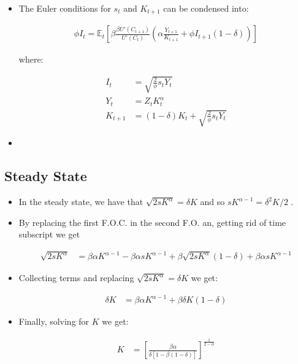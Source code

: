 \documentclass[11pt]{article}
\newcommand{\E}{\mathbb{E}}
\numberwithin{equation}{section}
\begin{document}
\begin{itemize}
 \item The Euler conditions for $s_{t}$ and $K_{t+1}$ can be condensed into:
 
 \begin{align*}
 \phi I_{t} = \E_t \left[ \beta \frac{\beta U'(C_{t+1})}{U'(C_t)} \left(\alpha \frac{Y_{t+1}}{K_{t+1}} + \phi I_{t+1} (1-\delta) \right) \right]
 \end{align*}
 
 where:
 
 \begin{align*}
 I_t & = \sqrt{\frac{2}{\phi} s_t Y_{t}} \\
 Y_t & = Z_t K^{\alpha}_t \\
 K_{t+1} & = (1-\delta) K_t + \sqrt{\frac{2}{\phi} s_t Y_t}
 \end{align*} 
 
 \item 
\end{itemize}

	
	\subsection{Steady State}
	\begin{itemize}	
	\item In the steady state, we have that $\sqrt{2 s K^\alpha} = \delta K$ and so $s K^{\alpha-1} =\delta^2 K/2$ .
	
	\item By replacing the first F.O.C. in the second F.O. an, getting rid of time subscript we get
	
	\begin{align} \sqrt{2 s K^\alpha}& = \beta \alpha K^{\alpha-1}  - \beta \alpha s K^{\alpha-1} +\beta \sqrt{2 s K^\alpha} (1-\delta) + \beta \alpha s  K^{\alpha-1}
	\end{align}
	
	\item Collecting terms and replacing $\sqrt{2 s K^\alpha} = \delta K$ we get:
	
	\begin{align} \delta K & = \beta \alpha K^{\alpha-1} +\beta \delta K (1-\delta) 
	\end{align}
	
	\item Finally, solving for $K$ we get:
	
		\begin{align}  K & = \left[\frac{\beta \alpha}{\delta[1-\beta(1-\delta)]} \right]^\frac{1}{2-\alpha}
	\end{align}
	
	\end{itemize}
	
\end{document}
